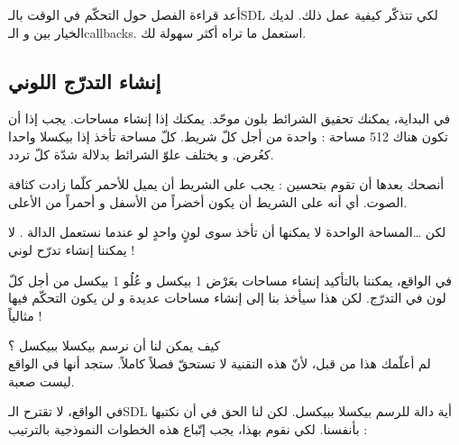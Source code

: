 أعد قراءة الفصل حول التحكّم في الوقت بالـ\textenglish{SDL}
لكي تتذكّر كيفية عمل ذلك. لديك الخيار بين
و الـ\textenglish{callbacks}.
استعمل ما تراه أكثر سهولة لك.

\subsection{إنشاء التدرّج اللوني}

في البداية، يمكنك تحقيق الشرائط بلون موحّد. يمكنك إذا إنشاء مساحات. يجب إذا أن تكون هناك 512 مساحة : واحدة من أجل كلّ شريط. كلّ مساحة تأخذ إذا بيكسلا واحدا كعُرض. و يختلف علوّ الشرائط بدلالة شدّة كلّ تردد.

أنصحك بعدها أن تقوم بتحسين : يجب على الشريط أن يميل للأحمر كلّما زادت كثافة الصوت. أي أنه على الشريط أن يكون أخضراً من الأسفل و أحمراً من الأعلى.

\begin{question}
لكن \dots المساحة الواحدة لا يمكنها أن تأخذ سوى لونٍ واحدٍ لو عندما نستعمل الدالة
.
لا يمكننا إنشاء تدرّح لوني !
\end{question}

في الواقع، يمكننا بالتأكيد إنشاء مساحات بعَرْض 1 بيكسل و عُلُو 1 بيكسل من أجل كلّ لون في التدرّج. لكن هذا سيأخذ بنا إلى إنشاء مساحات عديدة و لن يكون التحكّم فيها مثالياً !

كيف يمكن لنا أن نرسم بيكسلا ببيكسل ؟\\
لم أعلّمك هذا من قبل، لأنّ هذه التقنية لا تستحقّ فصلاً كاملاً. ستجد أنها في الواقع ليست صعبة. 

في الواقع، لا تقترح الـ\textenglish{SDL}
أية دالة للرسم بيكسلا ببيكسل. لكن لنا الحق في أن نكتبها بأنفسنا. لكي نقوم بهذا، يجب إتّباع هذه الخطوات النموذجية بالترتيب :

